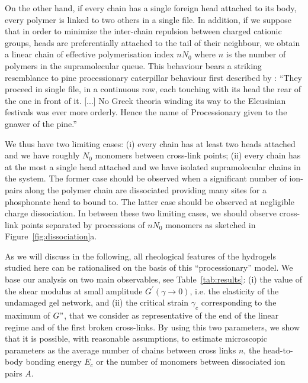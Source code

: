 \documentclass[journal=jacsat,manuscript=article]{achemso}
\begin{document}
On the other hand, if every chain has a single foreign head attached to its body, every polymer is linked to two others in a single file. In addition, if we suppose that in order to minimize the inter-chain repulsion between charged cationic groups, heads are preferentially attached to the tail of their neighbour, we obtain a linear chain of effective polymerisation index $n N_0$ where $n$ is the number of polymers in the supramolecular queue. This behaviour bears a striking resemblance to pine processionary caterpillar behaviour first described by \citet{Fabre1916}: 
``They proceed in single file, in a continuous row, each touching with its head the rear of the one in front of it. [...] No Greek theoria winding its way to the Eleusinian festivals was ever more orderly. Hence the name of Processionary given to the gnawer of the pine.''



We thus have two limiting cases: (i) every chain has at least two heads attached and we have roughly $N_0$ monomers between cross-link points; (ii) every chain has at the most a single head attached and we have isolated supramolecular chains in the system. The former case should be observed when a significant number of ion-pairs along the polymer chain are dissociated providing many sites for a phosphonate head to bound to. The latter case should be observed at negligible charge dissociation. In between these two limiting cases, we should observe cross-link points separated by processions of $n N_0$ monomers as sketched in Figure~\ref{fig:dissociation}a.

As we will discuss in the following, all rheological features of the hydrogels studied here can  be rationalised on the basis of this ``processionary'' model. We base our analysis on two main observables, see Table~\ref{tab:results}: (i) the value of the shear modulus at small amplitude $G^\prime(\gamma\rightarrow 0)$, i.e. the elasticity of the undamaged gel network, and (ii) the critical strain $\gamma_c$ corresponding to the maximum of $G"$, that we consider as representative of the end of the linear regime and of the first broken cross-links\cite{Hyun2011}. By using this two parameters, we show that it is possible, with reasonable assumptions, to estimate microscopic parameters as the average number of chains between cross links $n$, the head-to-body bonding energy $E_c$ or the number of monomers between dissociated ion pairs $A$.
\end{document}
